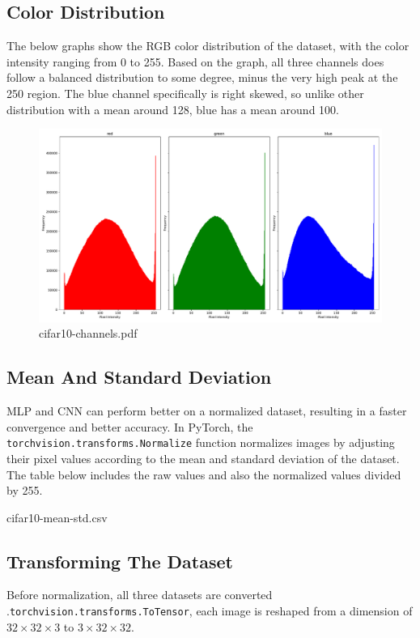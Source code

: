 \documentclass{report}
\begin{document}
\subsection{Color Distribution} 
The below graphs show the RGB color distribution of the dataset, with the color intensity ranging from 0 to 
255. Based on the graph, all three channels does follow a balanced distribution to some degree, minus the very 
high peak at the 250 region. The blue channel specifically is right skewed, so unlike other distribution with a 
mean around 128, blue has a mean around 100.

\begin{figure}[ht]
    \center
    \includegraphics[scale=0.4]{../output/cifar10-channels.pdf}
    \caption{cifar10-channels.pdf}
\end{figure}

\subsection{Mean And Standard Deviation} 
MLP and CNN can perform better on a normalized dataset, resulting in a faster convergence and better accuracy. 
In PyTorch, the \texttt{torchvision.transforms.Normalize} function normalizes images by adjusting their pixel 
values according to the mean and standard deviation of the dataset. The table below includes the raw values 
and also the normalized values divided by 255.

\begin{table}[ht]
    \center
    \caption{cifar10-mean-std.csv}
\end{table}

\subsection{Transforming The Dataset}
Before normalization, all three datasets are converted .\texttt{torchvision.transforms.ToTensor}, each image is 
reshaped from a dimension of $32\times32\times3$ to $3\times32\times32$.
\end{document}
